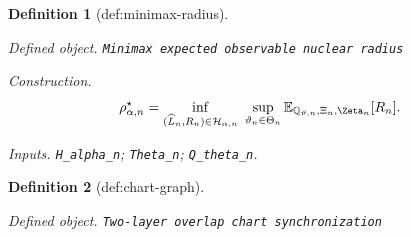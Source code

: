 \documentclass{article}
\newtheorem{definition}{Definition}
\begin{document}
\begin{definition}[def:minimax-radius]\label{def:minimax-radius}
\par\smallskip\noindent\emph{Defined object.} \texttt{Minimax expected observable nuclear radius}
\par\smallskip\noindent\emph{Construction.} \[\rho_{\alpha,n}^{\star}=\inf_{(\widehat L_n,R_n)\in\mathcal H_{\alpha,n}}\ \sup_{\vartheta_n\in\Theta_n}\mathbb E_{\mathbb Q_{\vartheta,n},\Xi_n,\Zeta_n}[R_n].\]
\par\smallskip\noindent\emph{Inputs.} \texttt{H\_\allowbreak{}alpha\_\allowbreak{}n}; \texttt{Theta\_\allowbreak{}n}; \texttt{Q\_\allowbreak{}theta\_\allowbreak{}n}.
\end{definition}

\begin{definition}[def:chart-graph]\label{def:chart-graph}
\par\smallskip\noindent\emph{Defined object.} \texttt{Two-\allowbreak{}layer overlap chart synchronization}

\end{definition}
\end{document}
